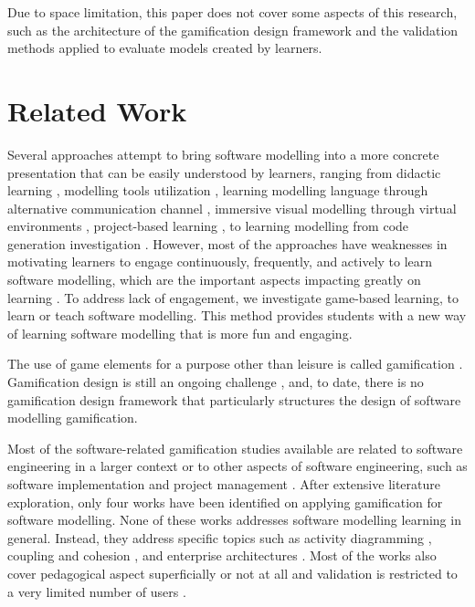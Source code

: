\documentclass[runningheads,a4paper]{llncs}
\begin{document}
Due to space limitation, this paper does not cover some aspects of this research, such as the architecture of the gamification design framework and the validation methods applied to evaluate models created by learners. 

\section{Related Work}
Several approaches attempt to bring software modelling into a more concrete presentation that can be easily understood by learners, ranging from didactic learning \cite{moisan2009teaching}, modelling tools utilization \cite{Akayama2013}, learning modelling language through alternative communication channel \cite{Brandsteidl2011}, immersive visual modelling through virtual environments \cite{neubauer2003immersive}, project-based learning \cite{Szmurlo2007}, to learning modelling from code generation investigation \cite{schmidt2014teaching}. However, most of the approaches have weaknesses in motivating learners to engage continuously, frequently, and actively to learn software modelling, which are the important aspects impacting greatly on learning \cite{Naps2005}. To address lack of engagement, we investigate game-based learning, to learn or teach software modelling. This method provides students with a new way of learning software modelling that is more fun and engaging. 

The use of game elements for a purpose other than leisure is called gamification \cite{deterding2011game}. Gamification design is still an ongoing challenge \cite{Deterding2013}, and, to date, there is no gamification design framework that particularly structures the design of software modelling gamification.

Most of the software-related gamification studies available are related to software engineering in a larger context or to other aspects of software engineering, such as software implementation and project management \cite{Pedreira2015}. After extensive literature exploration, only four works have been identified on applying gamification for software modelling. None of these works addresses software modelling learning in general. Instead, they address specific topics such as activity diagramming \cite{Richardsen2014}, coupling and cohesion \cite{Stikkolorum2014}, and enterprise architectures \cite{Groenewegen2010} \cite{Ionita2015}. Most of the works also cover pedagogical aspect superficially or not at all and validation is restricted to a very limited number of users \cite{Richardsen2014}\cite{Stikkolorum2014}\cite{Groenewegen2010}.
\end{document}
